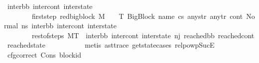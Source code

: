 \begin{isabellebody}
\ inter{\isacharunderscore}{\kern0pt}bb\ inter{\isacharunderscore}{\kern0pt}cont\ inter{\isacharunderscore}{\kern0pt}state\ \isanewline
\ \ \ \ \ \ \ \ first{\isacharunderscore}{\kern0pt}step{\isacharcolon}{\kern0pt}\ {\isachardoublequoteopen}red{\isacharunderscore}{\kern0pt}bigblock\ M\ {\isasymLambda}\ {\isasymGamma}\ {\isasymOmega}\ T\ {\isacharparenleft}{\kern0pt}{\isacharparenleft}{\kern0pt}BigBlock\ name\ cs{}\ any{\isacharunderscore}{\kern0pt}str\ any{\isacharunderscore}{\kern0pt}tr{\isacharparenright}{\kern0pt}{\isacharcomma}{\kern0pt}\ cont{}{\isacharcomma}{\kern0pt}\ {\isacharparenleft}{\kern0pt}Normal\ ns{}{\isacharparenright}{\kern0pt}{\isacharparenright}{\kern0pt}\ {\isacharparenleft}{\kern0pt}inter{\isacharunderscore}{\kern0pt}bb{\isacharcomma}{\kern0pt}\ inter{\isacharunderscore}{\kern0pt}cont{\isacharcomma}{\kern0pt}\ inter{\isacharunderscore}{\kern0pt}state{\isacharparenright}{\kern0pt}{\isachardoublequoteclose}\ \isanewline
\ \ \ \ \ \ \ \ rest{\isacharunderscore}{\kern0pt}of{\isacharunderscore}{\kern0pt}steps{\isacharcolon}{\kern0pt}\ {\isachardoublequoteopen}M{\isacharcomma}{\kern0pt}{\isasymLambda}{\isacharcomma}{\kern0pt}{\isasymGamma}{\isacharcomma}{\kern0pt}{\isasymOmega}{\isacharcomma}{\kern0pt}T\ {\isasymturnstile}\ {\isacharparenleft}{\kern0pt}inter{\isacharunderscore}{\kern0pt}bb{\isacharcomma}{\kern0pt}\ inter{\isacharunderscore}{\kern0pt}cont{\isacharcomma}{\kern0pt}\ inter{\isacharunderscore}{\kern0pt}state{\isacharparenright}{\kern0pt}\ {\isacharminus}{\kern0pt}n{\isasymlongrightarrow}{\isacharcircum}{\kern0pt}j{\isacharprime}{\kern0pt}\ {\isacharparenleft}{\kern0pt}reached{\isacharunderscore}{\kern0pt}bb{\isacharcomma}{\kern0pt}\ reached{\isacharunderscore}{\kern0pt}cont{\isacharcomma}{\kern0pt}\ reached{\isacharunderscore}{\kern0pt}state{\isacharparenright}{\kern0pt}{\isachardoublequoteclose}\ \isanewline
\ \ \ \ \ \ \ \ \isamarkupfalse%
\ {\isacharparenleft}{\kern0pt}metis\ ast{\isacharunderscore}{\kern0pt}trace\ get{\isacharunderscore}{\kern0pt}state{\isachardot}{\kern0pt}cases\ relpowp{\isacharunderscore}{\kern0pt}Suc{\isacharunderscore}{\kern0pt}E{}{\isacharparenright}{\kern0pt}\isanewline
\isanewline
\ \ \ \ \ \ \isamarkupfalse%
\ cfg{\isacharunderscore}{\kern0pt}correct\ Cons\ block{\isacharunderscore}{\kern0pt}id\isanewline
\ \ \ \ \ \ \isamarkupfalse%

\end{isabellebody}
